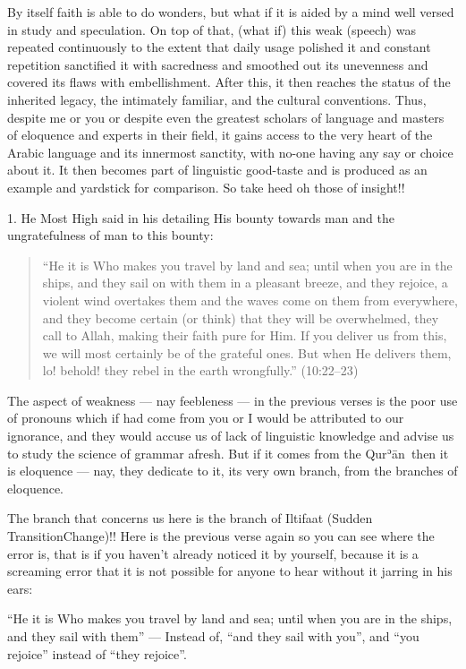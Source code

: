 \documentclass[12pt]{memoir}
\def\´{ʾ} %
\def \Quran{Qur\-\´ān} %
\def\/{\discretionary{/}{}{/}}
\newcommand{\QRef}[1]{{\color{darkblue}#1}}
\begin{document}
By itself faith is able to do wonders, but what if it is aided
by a mind well versed in study and speculation.
On top of that, (what if) this weak (speech) was repeated continuously
to the extent that daily usage polished it and constant repetition sanctified
it with sacredness and smoothed out its unevenness
and covered its flaws with embellishment.
After this, it then reaches the status of the inherited legacy,
the intimately familiar, and the cultural conventions.
Thus, despite me or you or despite even the greatest scholars of language
and masters of eloquence and experts in their field,
it gains access to the very heart of the Arabic language
and its innermost sanctity, with no-one having any say or choice about it.
It then becomes part of linguistic good-taste and is produced as an example
and yardstick for comparison. So take heed oh those of insight!!

1. He Most High said in his detailing His bounty towards man
and the ungratefulness of man to this bounty:

\begin{quote}
“He it is Who makes you travel by land and sea;
until when you are in the ships, and they sail on with them
in a pleasant breeze, and they rejoice, a violent wind overtakes them
and the waves come on them from everywhere,
and they become certain (or think) that they will be overwhelmed,
they call to Allah, making their faith pure for Him.
If you deliver us from this, we will most certainly be of the grateful ones.
But when He delivers them, lo! behold! they rebel in the earth wrongfully.”
(\QRef{10:22–23})
\end{quote}

The aspect of weakness — nay feebleness — in the previous verses
is the poor use of pronouns which if had come from you
or I would be attributed to our ignorance,
and they would accuse us of lack of linguistic knowledge
and advise us to study the science of grammar afresh.
But if it comes from the \Quran\ then it is eloquence —
nay, they dedicate to it, its very own branch, from the branches of eloquence.

The branch that concerns us here is the branch of Iltifaat
(Sudden Transition\/Change)!!
Here is the previous verse again so you can see where the error is,
that is if you haven’t already noticed it by yourself,
because it is a screaming error that it is not possible
for anyone to hear without it jarring in his ears:

“He it is Who makes you travel by land and sea;
until when you are in the ships, and they sail with them” —
Instead of, “and they sail with you”,
and “you rejoice” instead of “they rejoice”.
\end{document}
